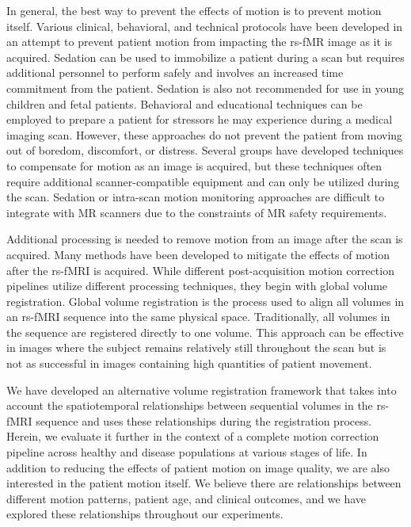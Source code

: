 In general, the best way to prevent the effects of motion is to prevent motion itself. Various clinical, behavioral, and technical protocols have been developed in an attempt to prevent patient motion from impacting the rs-fMR image as it is acquired. Sedation can be used to immobilize a patient during a scan but requires additional personnel to perform safely and involves an increased time commitment from the patient. Sedation is also not recommended for use in young children and fetal patients. Behavioral and educational techniques can be employed to prepare a patient for stressors he may experience during a medical imaging scan. However, these approaches do not prevent the patient from moving out of boredom, discomfort, or distress. Several groups have developed techniques to compensate for motion as an image is acquired, but these techniques often require additional scanner-compatible equipment and can only be utilized during the scan. Sedation or intra-scan motion monitoring approaches are difficult to integrate with MR scanners due to the constraints of MR safety requirements. 

Additional processing is needed to remove motion from an image after the scan is acquired. Many methods have been developed to mitigate the effects of motion after the rs-fMRI is acquired. While different post-acquisition motion correction pipelines utilize different processing techniques, they begin with global volume registration. Global volume registration is the process used to align all volumes in an rs-fMRI sequence into the same physical space. Traditionally, all volumes in the sequence are registered directly to one volume. This approach can be effective in images where the subject remains relatively still throughout the scan but is not as successful in images containing high quantities of patient movement.

We have developed an alternative volume registration framework that takes into account the spatiotemporal relationships between sequential volumes in the rs-fMRI sequence and uses these relationships during the registration process. Herein, we evaluate it further in the context of a complete motion correction pipeline across healthy and disease populations at various stages of life. In addition to reducing the effects of patient motion on image quality, we are also interested in the patient motion itself. We believe there are relationships between different motion patterns, patient age, and clinical outcomes, and we have explored these relationships throughout our experiments.

